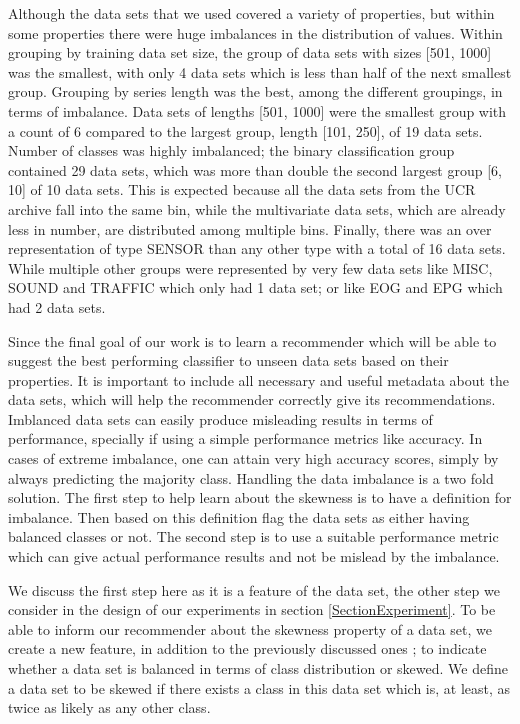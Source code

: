 Although the data sets that we used covered a variety of properties, but within some properties there were huge imbalances in the distribution of values.
Within grouping by training data set size, the group of data sets with sizes [501, 1000] was the smallest, with only 4 data sets which is less than half of the next smallest group.
Grouping by series length was the best, among the different groupings, in terms of imbalance. Data sets of lengths [501, 1000] were the smallest group with a count of 6 compared to the largest group, length [101, 250], of 19 data sets.
Number of classes was highly imbalanced; the binary classification group contained 29 data sets, which was more than double the second largest group [6, 10] of 10 data sets.
This is expected because all the data sets from the UCR archive fall into the same bin, while the multivariate data sets, which are already less in number, are distributed among multiple bins.
Finally, there was an over representation of type SENSOR than any other type with a total of 16 data sets.
While multiple other groups were represented by very few data sets like MISC, SOUND and TRAFFIC which only had 1 data set; or like EOG and EPG which had 2 data sets.


Since the final goal of our work is to learn a recommender which will be able to suggest the best performing classifier to unseen data sets based on their properties.
It is important to include all necessary and useful metadata about the data sets, which will help the recommender correctly give its recommendations.
Imblanced data sets can easily produce misleading results in terms of performance, specially if using a simple performance metrics like accuracy.
In cases of extreme imbalance, one can attain very high accuracy scores, simply by always predicting the majority class.
Handling the data imbalance is a two fold solution.
The first step to help learn about the skewness is to have a definition for imbalance. Then based on this definition flag the data sets as either having balanced classes or not.
The second step is to use a suitable performance metric which can give actual performance results and not be mislead by the imbalance.

We discuss the first step here as it is a feature of the data set, the other step we consider in the design of our experiments in section \ref{SectionExperiment}.
To be able to inform our recommender about the skewness property of a data set, we create a new feature, in addition to the previously discussed ones ; to indicate whether a data set is balanced in terms of class distribution or skewed.
We define a data set to be skewed if there exists a class in this data set which is, at least, as twice as likely as any other class.

